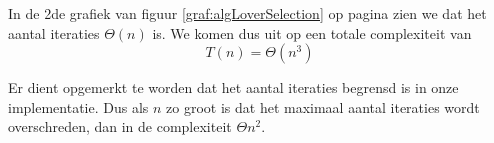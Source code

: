 In de 2de grafiek van figuur \ref{graf:algLoverSelection} op pagina \pageref{graf:algLoverSelection} zien we dat het aantal iteraties $\Theta(n)$ is. We komen dus uit op een totale complexiteit van \[T(n)=\Theta\left(n^3\right)\]

Er dient opgemerkt te worden dat het aantal iteraties begrensd is in onze implementatie. Dus als $n$ zo groot is dat het maximaal aantal iteraties wordt overschreden, dan in de complexiteit $\Theta{n^2}$.

%